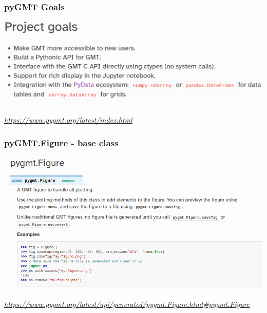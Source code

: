 \documentclass[unknownkeysallowed]{beamer}
\begin{document}
\begin{frame}
\frametitle{pyGMT Goals}
	\vspace{-0.25cm}
	\begin{center}
		\includegraphics[width=\textwidth]{../figures/pygmt_goals.png}
	\end{center}
	\begin{flushright}
	\vspace{-0.15cm}
	\tiny{\emph{\url{https://www.pygmt.org/latest/index.html}}}
	\end{flushright}	
\end{frame}

\begin{frame}[fragile=singleslide]
\frametitle{pyGMT.Figure - base class}
	\begin{center}
			\includegraphics[width=\textwidth]{../figures/pygmt_figure.png}	
	\end{center}
	\begin{flushright}
	\vspace{-0.35cm}
	\tiny{\emph{\url{https://www.pygmt.org/latest/api/generated/pygmt.Figure.html\#pygmt.Figure}}}
	\end{flushright}	
\end{frame}
\end{document}
